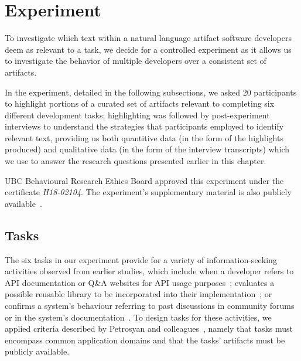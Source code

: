 
\section{Experiment}
\label{cp3:experiment}



To investigate which text within a natural language artifact software developers deem as relevant to a task,
 we decide for a controlled experiment
 as it allows us to investigate the behavior of multiple developers
over a consistent set of artifacts.



In the experiment, detailed in the following subsections,
we asked 20 participants to highlight portions of a curated
set of artifacts relevant to completing six different development tasks;
 highlighting was followed by post-experiment 
interviews to understand the
strategies that participants employed to identify relevant text,
providing us both 
quantitive data (in the form of the highlights produced) 
and qualitative data (in the form of the interview transcripts) 
which we use to answer the research questions 
presented earlier in this chapter.






\acs{UBC} Behavioural Research Ethics Board  approved this experiment under the certificate \textit{H18-02104}.
The experiment's supplementary material is also publicly available~\cite{dssynthetic}.




\subsection{Tasks}
\label{cp3:method-tasks}


The six tasks in our experiment provide for a variety of information-seeking activities observed from earlier
studies, which include when a developer
refers to API documentation or Q\&A websites for API usage purposes~\cite{umarji2008archetypal, Singer1998,robillard2011field};
evaluates a possible reusable library to be incorporated into their implementation~\cite{umarji2008archetypal}; or
confirms a system's behaviour referring to past discussions in community forums or in the system's documentation~\cite{umarji2008archetypal, Lotufo2012, Singer1998}.
To design tasks for these activities, we applied criteria described by Petrosyan and colleagues~\cite{Petrosyan2015}, namely that
tasks must encompass common application domains and that the tasks' artifacts must be publicly available.



